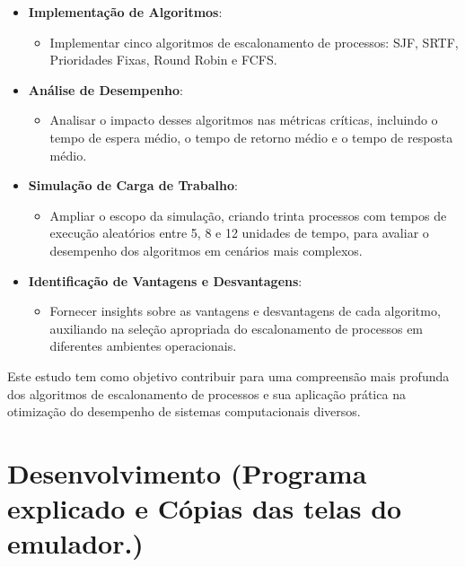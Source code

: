 \documentclass[
	12pt,				%
	openright,			%
	oneside,			%
	a4paper,			%
	chapter=TITLE,		%
	english,			%
	french,				%
	spanish,			%
	brazil				%
	]{abntex2}
\theoremstyle{definition}
\begin{document}
\begin{itemize}
    \item \textbf{Implementação de Algoritmos}:
    \begin{itemize}
        \item Implementar cinco algoritmos de escalonamento de processos: SJF, SRTF, Prioridades Fixas, Round Robin e FCFS.
    \end{itemize}
    
    \item \textbf{Análise de Desempenho}:
    \begin{itemize}
        \item Analisar o impacto desses algoritmos nas métricas críticas, incluindo o tempo de espera médio, o tempo de retorno médio e o tempo de resposta médio.
    \end{itemize}
    
    \item \textbf{Simulação de Carga de Trabalho}:
    \begin{itemize}
        \item Ampliar o escopo da simulação, criando trinta processos com tempos de execução aleatórios entre 5, 8 e 12 unidades de tempo, para avaliar o desempenho dos algoritmos em cenários mais complexos.
    \end{itemize}
    
    \item \textbf{Identificação de Vantagens e Desvantagens}:
    \begin{itemize}
        \item Fornecer insights sobre as vantagens e desvantagens de cada algoritmo, auxiliando na seleção apropriada do escalonamento de processos em diferentes ambientes operacionais.
    \end{itemize}
\end{itemize}


Este estudo tem como objetivo contribuir para uma compreensão mais profunda dos algoritmos de escalonamento de processos e sua aplicação prática na otimização do desempenho de sistemas computacionais diversos.
  

\chapter{Desenvolvimento (Programa explicado e Cópias das telas do emulador.)}
\end{document}

